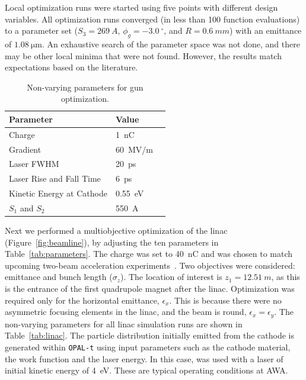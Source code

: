Local optimization runs were started using five points 
with different design variables. All optimization runs converged 
(in less than 100 function evaluations) to a parameter set ($S_3=\SI{269}{A}$,
$\phi_g=\SI{-3.0}{^{\circ}}$, and $R=\SI{0.6}{mm}$) with an emittance of $\SI{1.08}{\um}$.
An exhaustive search of the parameter space was not done, and there may be other local minima that were not found.
However, the results match expectations based on the literature. 
\begin{table}%
	\caption{\label{tab:gun} Non-varying parameters for gun optimization.}
	\begin{center}
		\begin{tabular}{lll}
			\toprule
			\textbf{Parameter} & \textbf{Value} \\
			\midrule
			Charge  & \SI{1}{nC} \\
			Gradient & \SI{60}{MV/m} \\
			Laser FWHM & \SI{20}{ps} \\
			Laser Rise and Fall Time & \SI{6}{ps} \\
			Kinetic Energy at Cathode  & \SI{0.55}{eV} \\
			$S_1$ and $S_2$ & \SI{550}{A} \\
			\bottomrule
		\end{tabular}
	\end{center}
\end{table}

\label{sec:linacopt}
Next we performed a multiobjective optimization of the linac (Figure~\ref{fig:beamline}), 
by adjusting the ten parameters in Table~\ref{tab:parameters}. The charge was set to \SI{40}{nC}
and was chosen to match upcoming two-beam acceleration experiments~\cite{tba2017}. 
Two objectives were considered: emittance and bunch length ($\sigma_z$). 
The location of interest is $z_1=\SI{12.51}{m}$, as this is the entrance of the first 
quadrupole magnet after the linac. Optimization was required only for the horizontal emittance, $\epsilon_{x}$.  This is because there were no asymmetric focusing elements in the linac, and the beam is round, $\epsilon_{x}=\epsilon_{y}$. 
The non-varying parameters for all linac simulation runs are shown in Table~\ref{tab:linac}.  The particle distribution initially emitted from the cathode is generated within \verb|OPAL-t| using input parameters such as the cathode material, the work function and the laser energy.   In this case, was used with a laser of initial kinetic energy of \SI{4}{eV}. 
These are typical operating conditions at AWA. 


